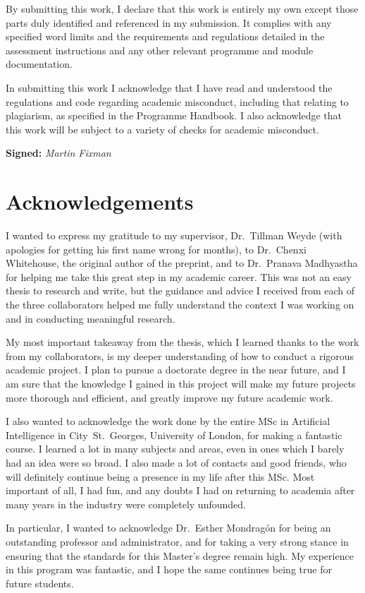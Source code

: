\documentclass[a4paper,11pt]{article}
\begin{document}
By submitting this work, I declare that this work is entirely my own except those parts duly identified and referenced in my submission.
It complies with any specified word limits and the requirements and regulations detailed in the assessment instructions and any other relevant programme and module documentation.

In submitting this work I acknowledge that I have read and understood the regulations and code regarding academic misconduct, including that relating to plagiarism, as specified in the Programme Handbook.
I also acknowledge that this work will be subject to a variety of checks for academic misconduct.

\textbf{Signed:} \textsl{Martin Fixman}

\section*{Acknowledgements}

I wanted to express my gratitude to my supervisor, Dr.\ Tillman Weyde (with apologies for getting his first name wrong for months), to Dr.\ Chenxi Whitehouse, the original author of the preprint, and to Dr.\ Pranava Madhyastha for helping me take this great step in my academic career.
This was not an easy thesis to research and write, but the guidance and advice I received from each of the three collaborators helped me fully understand the context I was working on and in conducting meaningful research.

My most important takeaway from the thesis, which I learned thanks to the work from my collaborators, is my deeper understanding of how to conduct a rigorous academic project.
I plan to pursue a doctorate degree in the near future, and I am sure that the knowledge I gained in this project will make my future projects more thorough and efficient, and greatly improve my future academic work.

I also wanted to acknowledge the work done by the entire MSc in Artificial Intelligence in City~St.~Georges, University of London, for making a fantastic course.
I learned a lot in many subjects and areas, even in ones which I barely had an idea were so broad.
I also made a lot of contacts and good friends, who will definitely continue being a presence in my life after this MSc.
Most important of all, I had fun, and any doubts I had on returning to academia after many years in the industry were completely unfounded.

In particular, I wanted to acknowledge Dr.\ Esther Mondragón for being an outstanding professor and administrator, and for taking a very strong stance in ensuring that the standards for this Master's degree remain high.
My experience in this program was fantastic, and I hope the same continues being true for future students.
\end{document}
